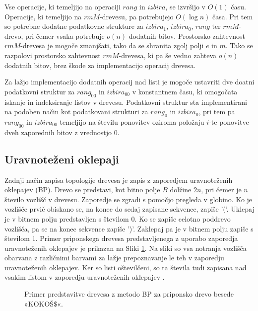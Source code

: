 Vse operacije, ki temeljijo na operaciji $rang$ in $izbira$, se izvršijo v $O(1)$ času. Operacije, ki temeljijo na $rmM$-drevesu, pa potrebujejo $O(\log{n})$ časa. Pri tem so potrebne dodatne podatkovne strukture za $izbira_1$, $izbira_0$, $rang$ ter $rmM$-drevo, pri čemer vsaka potrebuje $o(n)$ dodatnih bitov. Prostorsko zahtevnost $rmM$-drevesa je mogoče zmanjšati, tako da se shranita zgolj polji $e$ in $m$. Tako se razpolovi prostorsko zahtevnost $rmM$-drevesa, ki pa še vedno zahteva $o(n)$ dodatnih bitov, brez škode za implementacijo operacij drevesa.

Za lažjo implementacijo dodatnih operacij nad listi je mogoče ustavriti dve doatni podatkovni struktur za $rang_{00}$ in $izbira_{00}$ v konstantnem času, ki omogočata iskanje in indeksiranje listov v drevesu. Podatkovni struktur sta implementirani na podoben način kot podatkovani strukturi za $rang_0$ in $izbira_0$, pri tem pa $rang_{00}$ in $izbira_{00}$ temeljijo na številu ponovitev oziroma položaju $i$-te ponovitve dveh zaporednih bitov z vrednostjo 0.

\subsection{Uravnoteženi oklepaji}\label{sec:oklepaji}

Zadnji način zapisa topologije drevesa je zapis z zaporedjem uravnoteženih oklepajev (BP). Drevo se predstavi, kot bitno polje $B$ dolžine $2n$, pri čemer je $n$ število vozlišč v drevesu. Zaporedje se zgradi s pomočjo pregleda v globino. Ko je vozlišče prvič obiskano se, na konec do sedaj zapisane sekvence, zapiše '('. Uklepaj je v bitnem polju predstavljen s številom $0$. Ko se zapiše celotno poddrevo vozlišča, pa se na konec sekvence zapiše ')'. Zaklepaj pa je v bitnem polju zapiše s številom $1$. Primer priponskega drevesa predstavljenega z uporabo zaporedja uravnoteženih oklepajev je prikazan na Sliki \ref{fig:BP}. Na sliki so vsa notranja vozlišča obarvana z različnimi barvami za lažje prepoznavanje le teh v zaporedju uravnoteženih oklepajev. Ker so listi oštevilčeni, so ta števila tudi zapisana nad vsakim listom v zaporedju uravnoteženih oklepajev \cite{Navarro2016}.

\begin{figure}[htb]
    \begin{center}
        
        \caption{Primer predstavitve drevesa z metodo BP za priponsko drevo besede »KOKOŠ$\$$«.} 
        \label{fig:BP}
    \end{center}
\end{figure}

